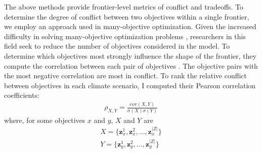 The above methods provide frontier-level metrics of conflict and tradeoffs. To determine the degree of conflict between two objectives within a single frontier, we employ an approach used in many-objective optimization. Given the increased difficulty in solving many-objective optimization problems \cite{khare2003performance}, researchers in this field seek to reduce the number of objectives considered in the model. To determine which objectives most strongly influence the shape of the frontier, they compute the correlation between each pair of objectives \cite{deb2005finding}. The objective pairs with the most negative correlation are most in conflict. To rank the relative conflict between objectives in each climate scenario, I computed their Pearson correlation coefficients:
\begin{align}
\rho_{X,Y} = \frac{\text{cov}(X,Y)}{\sigma(X)\sigma(Y)}
\end{align}
where, for some objectives $x$ and $y$, $X$ and $Y$ are
\begin{align}
X = \{ \mathbf{z}_x^1, \mathbf{z}_x^2, \ldots, \mathbf{z}_x^{|Z|} \} \\
Y = \{ \mathbf{z}_y^1, \mathbf{z}_y^2, \ldots, \mathbf{z}_y^{|Z|} \}
\end{align}